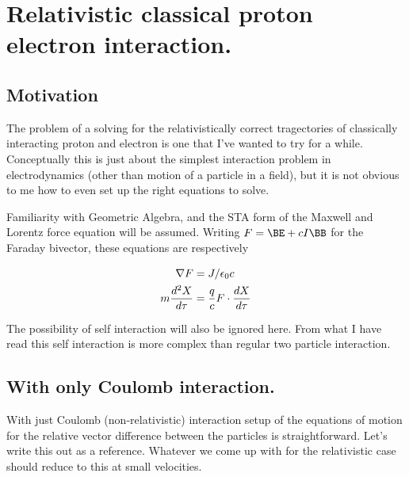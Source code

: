 

\chapter{Relativistic classical proton electron interaction.}
\label{chap:nuclearInteraction}
{}
\date{Sept 13, 2009}

\beginArtWithToc

\section{Motivation}

The problem of a solving for the relativistically correct tragectories of classically interacting proton and electron is one that I've wanted to try for a while.  Conceptually this is just about the simplest interaction problem in electrodynamics (other than motion of a particle in a field), but it is not obvious to me how to even set up the right equations to solve.

Familiarity with Geometric Algebra, and the STA form of the Maxwell and Lorentz force equation will be assumed.  Writing $F = \BE + c I \BB$ for the Faraday bivector, these equations are respectively

\begin{align}\label{eqn:nuclearInteraction:boo1}
\nabla F &= J/\epsilon_0 c \\
m\frac{d^2 X}{d\tau} &= \frac{q}{c} F \cdot \frac{dX}{d\tau}
\end{align}

The possibility of self interaction will also be ignored here.  From what I have read this self interaction is more complex than regular two particle interaction.

\section{With only Coulomb interaction.}

With just Coulomb (non-relativistic) interaction setup of the equations of motion for the relative vector difference between the particles is straightforward.  Let's write this out as a reference.  Whatever we come up with for the relativistic case should reduce to this at small velocities.

